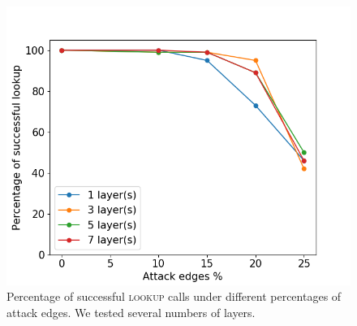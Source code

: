 \begin{figure}[t]
    \centering
    \includegraphics[scale=0.4]{exp4.png}
    \caption{Percentage of successful \textsc{lookup} calls under different percentages of attack edges. We tested several numbers of layers.}
    \label{fig:experiment_4}
\end{figure}